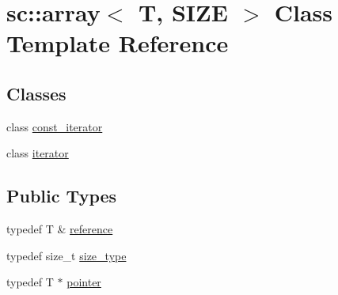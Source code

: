 \hypertarget{classsc_1_1array}{}\section{sc\+:\+:array$<$ T, S\+I\+ZE $>$ Class Template Reference}
\label{classsc_1_1array}
\subsection*{Classes}
\begin{DoxyCompactItemize}
\item 
class \hyperlink{classsc_1_1array_classsc_1_1array_1_1const__iterator}{const\+\_\+iterator}
\item 
class \hyperlink{classsc_1_1array_1_1iterator}{iterator}
\end{DoxyCompactItemize}
\subsection*{Public Types}
\begin{DoxyCompactItemize}
\item 
typedef T \& \hyperlink{classsc_1_1array_ae7d6903e3e7b850083c836e5061ac785}{reference}
\item 
typedef size\+\_\+t \hyperlink{classsc_1_1array_a6358115a468f72263895bbb17c924718}{size\+\_\+type}
\item 
typedef T $\ast$ \hyperlink{classsc_1_1array_a002fbbd9c16ad364964833f723b0d582}{pointer}
\end{DoxyCompactItemize}
